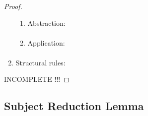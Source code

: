 \begin{theorem}
\begin{proof}
\begin{enumerate}
\begin{enumerate}
                \item Abstraction:
                    $$
                    \begin{array}{l|l}
                    \end{array}
                    $$

                \item Application:
                    $$
                    \begin{array}{l|l}
                    \end{array}
                    $$
            \end{enumerate}
            \item Structural rules:
        \end{enumerate}
        INCOMPLETE !!!
    \end{proof}
\end{theorem}



\subsection{Subject Reduction Lemma}

